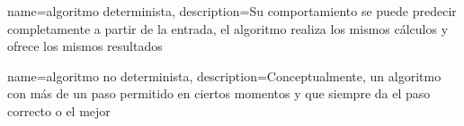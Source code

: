 

{
	name=algoritmo determinista,
	description={Su comportamiento se puede predecir completamente a partir de la entrada, el algoritmo realiza los mismos cálculos y ofrece los mismos resultados\cite{Black2009_DeterministicAlgorithm}}
}

{
	name=algoritmo no determinista,
	description={Conceptualmente, un algoritmo con más de un paso permitido en ciertos momentos y que siempre da el paso correcto o el mejor}
}